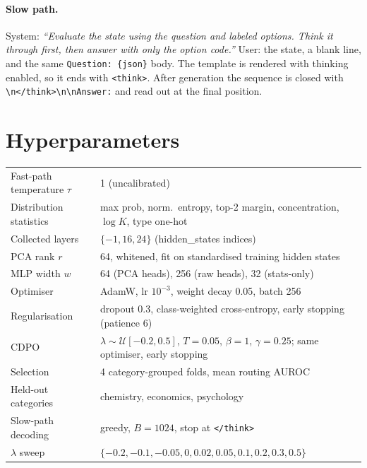 \documentclass{article}
\newcommand{\cdpo}{CDPO}
\begin{document}
\paragraph{Slow path.}
System: \emph{``Evaluate the state using the question and labeled options. Think it through first, then answer with only the option code.''} User: the state, a blank line, and the same \texttt{Question: \{json\}} body. The template is rendered with thinking enabled, so it ends with \texttt{<think>}. After generation the sequence is closed with \texttt{\textbackslash n</think>\textbackslash n\textbackslash nAnswer:} and read out at the final position.

\section{Hyperparameters}

\begin{table}[h]
\centering
\small
\begin{tabular}{ll}
\toprule
Fast-path temperature $\tau$ & 1 (uncalibrated) \\
Distribution statistics & max prob, norm.\ entropy, top-2 margin, concentration, $\log K$, type one-hot \\
Collected layers & $\{-1,16,24\}$ (hidden\_states indices) \\
PCA rank $r$ & 64, whitened, fit on standardised training hidden states \\
MLP width $w$ & 64 (PCA heads), 256 (raw heads), 32 (stats-only) \\
Optimiser & AdamW, lr $10^{-3}$, weight decay 0.05, batch 256 \\
Regularisation & dropout 0.3, class-weighted cross-entropy, early stopping (patience 6) \\
\cdpo{} & $\lambda\sim\mathcal{U}[-0.2,0.5]$, $T=0.05$, $\beta=1$, $\gamma=0.25$; same optimiser, early stopping \\
Selection & 4 category-grouped folds, mean routing AUROC \\
Held-out categories & chemistry, economics, psychology \\
Slow-path decoding & greedy, $B=1024$, stop at \texttt{</think>} \\
$\lambda$ sweep & $\{-0.2,-0.1,-0.05,0,0.02,0.05,0.1,0.2,0.3,0.5\}$ \\
\bottomrule
\end{tabular}
\end{table}
\end{document}
